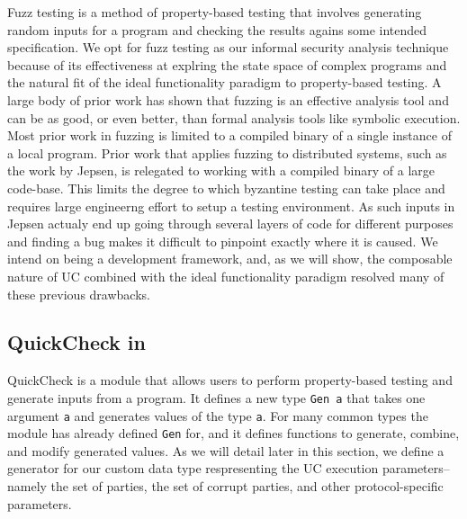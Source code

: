 Fuzz testing is a method of property-based testing that involves generating random inputs for a program and checking the results agains some intended specification.
We opt for fuzz testing as our informal security analysis technique because of its effectiveness at explring the state space of complex programs and the natural fit of the ideal functionality paradigm to property-based testing.
A large body of prior work has shown that fuzzing is an effective analysis tool and can be as good, or even better, than formal analysis tools like symbolic execution.
Most prior work in fuzzing is limited to a compiled binary of a single instance of a local program. 
Prior work that applies fuzzing to distributed systems, such as the work by Jepsen, is relegated to working with a compiled binary of a large code-base.
This limits the degree to which byzantine testing can take place and requires  large engineerng effort to setup a testing environment. 
As such inputs in Jepsen actualy end up going through several layers of code for different purposes and finding a bug makes it difficult to pinpoint exactly where it is caused. 
We intend on \us being a development framework, and, as we will show, the composable nature of UC combined with the ideal functionality paradigm resolved many of these previous drawbacks.

\subsection{QuickCheck in \us}
QuickCheck is a module that allows users to perform property-based testing and generate inputs from a program.
It defines a new type \texttt{Gen a} that takes one argument \texttt{a} and generates values of the type \texttt{a}.
For many common types the module has already defined \texttt{Gen} for, and it defines functions to generate, combine, and modify generated values. 
As we will detail later in this section, we define a generator for our custom data type respresenting the UC execution parameters--namely the set of parties, the set of corrupt parties, and other protocol-specific parameters.



